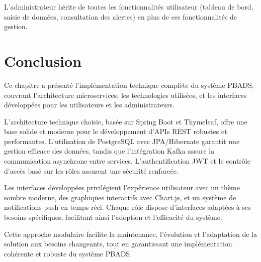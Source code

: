 L'administrateur hérite de toutes les fonctionnalités utilisateur (tableau de bord, saisie de données, consultation des alertes) en plus de ces fonctionnalités de gestion.

\section{Conclusion}

Ce chapitre a présenté l'implémentation technique complète du système PBADS, couvrant l'architecture microservices, les technologies utilisées, et les interfaces développées pour les utilisateurs et les administrateurs.

L'architecture technique choisie, basée sur Spring Boot et Thymeleaf, offre une base solide et moderne pour le développement d'APIs REST robustes et performantes. L'utilisation de PostgreSQL avec JPA/Hibernate garantit une gestion efficace des données, tandis que l'intégration Kafka assure la communication asynchrone entre services. L'authentification JWT et le contrôle d'accès basé sur les rôles assurent une sécurité renforcée.

Les interfaces développées privilégient l'expérience utilisateur avec un thème sombre moderne, des graphiques interactifs avec Chart.js, et un système de notifications push en temps réel. Chaque rôle dispose d'interfaces adaptées à ses besoins spécifiques, facilitant ainsi l'adoption et l'efficacité du système.

Cette approche modulaire facilite la maintenance, l'évolution et l'adaptation de la solution aux besoins changeants, tout en garantissant une implémentation cohérente et robuste du système PBADS.
